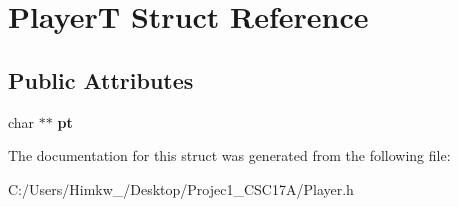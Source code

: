 \hypertarget{struct_player_t}{\section{Player\+T Struct Reference}
\label{struct_player_t}
}
\subsection*{Public Attributes}
\begin{DoxyCompactItemize}
\item 
\hypertarget{struct_player_t_adaf6adf9decf52473e14655a852f481d}{char $\ast$$\ast$ {\bfseries pt}}\label{struct_player_t_adaf6adf9decf52473e14655a852f481d}

\end{DoxyCompactItemize}


The documentation for this struct was generated from the following file\+:\begin{DoxyCompactItemize}
\item 
C\+:/\+Users/\+Himkw\+\_/\+Desktop/\+Projec1\+\_\+\+C\+S\+C17\+A/Player.\+h\end{DoxyCompactItemize}
